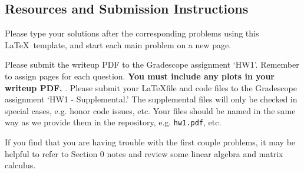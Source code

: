 \documentclass[submit]{../harvardml}
\begin{document}
\subsection*{Resources and Submission Instructions}



Please type your solutions after the corresponding problems using this \LaTeX\ template, and start each main problem on a new page.

Please submit the writeup PDF to the Gradescope assignment `HW1'. Remember to assign pages for each question.  \textbf{You must include any plots in your writeup PDF. }. Please submit your \LaTeX file and code files to the Gradescope assignment `HW1 - Supplemental.' The supplemental files will only be checked in special cases, e.g. honor code issues, etc. Your files should be named in the same way as we provide them in the repository, e.g. \texttt{hw1.pdf}, etc.

If you find that you are having trouble with the first couple problems, it may be helpful to refer to Section 0 notes and review some linear algebra and matrix calculus.

\newpage
\end{document}
